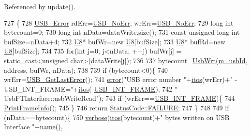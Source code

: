 Referenced by update().


\begin{DoxyCode}
727                                                                     \{
728   \hyperlink{LALUsbML_8h_aa7e5a2302774d5aa1d48a2a1cfc46e86}{USB\_Error} rdErr=\hyperlink{LALUsbML_8h_ab44759ae95dd86cbc2855adf525c43cd}{USB\_NoErr}, wrErr=\hyperlink{LALUsbML_8h_ab44759ae95dd86cbc2855adf525c43cd}{USB\_NoErr};
729   \textcolor{keywordtype}{long} \textcolor{keywordtype}{int} bytecount=0;
730   \textcolor{keywordtype}{long} \textcolor{keywordtype}{int} nData=dataWrite.size();
731   \textcolor{keyword}{const} \textcolor{keywordtype}{unsigned} \textcolor{keywordtype}{long} \textcolor{keywordtype}{int} bufSize=nData+4;
732   \hyperlink{ICECALv3_8h_a3cb25ca6f51f003950f9625ff05536fc}{U8}* bufWr=\textcolor{keyword}{new} \hyperlink{ICECALv3_8h_a3cb25ca6f51f003950f9625ff05536fc}{U8}[bufSize];
733   \hyperlink{ICECALv3_8h_a3cb25ca6f51f003950f9625ff05536fc}{U8}* bufRd=\textcolor{keyword}{new} \hyperlink{ICECALv3_8h_a3cb25ca6f51f003950f9625ff05536fc}{U8}[bufSize];
734 
735   \textcolor{keywordflow}{for}(\textcolor{keywordtype}{int} j=0; j<nData; ++j) bufWr[j] = static\_cast<unsigned char>(dataWrite[j]);
736 
737   bytecount=\hyperlink{LALUsbML_8h_a417eaf04d96bd2d3fca0111f8003bcb0}{UsbWrt}(\hyperlink{classUsbFTInterface_a91df5c0547e8be460bc087e27afe05aa}{m\_usbId}, address, bufWr, nData);
738 
739   \textcolor{keywordflow}{if} (bytecount<0)\{
740     wrErr=\hyperlink{LALUsbML_8h_a1662b77c9968848acf173f6f9c765ddd}{USB\_GetLastError}();
741     \hyperlink{classObject_a204a95f57818c0f811933917a30eff45}{error}(\textcolor{stringliteral}{"USB error number "}+\hyperlink{Tools_8h_af330027dbdafb9a30768b3613c553e60}{itos}(wrErr)+\textcolor{stringliteral}{" - USB\_INT\_FRAME="}+\hyperlink{Tools_8h_af330027dbdafb9a30768b3613c553e60}{itos}(
      \hyperlink{LALUsbML_8h_a68260f9cf3649507d12904cfa1592c11afd1c409187b1dfd3d66887a5e07e7ed3}{USB\_INT\_FRAME}),
742             \textcolor{stringliteral}{" UsbFTInterface::usbWriteRead"});
743     \textcolor{keywordflow}{if} (wrErr==\hyperlink{LALUsbML_8h_a68260f9cf3649507d12904cfa1592c11afd1c409187b1dfd3d66887a5e07e7ed3}{USB\_INT\_FRAME})\{
744       \hyperlink{LALUsbML_8h_ab3398c17204ba7fb4b47eb9bbf4ba94e}{PrintFrameInfo}();
745     \} 
746     \textcolor{keywordflow}{return} \hyperlink{classStatusCode_a6f565cbeadc76d14c72f047e5e85eb4ba3da73d4c469762eb9d3c960368252b26}{StatusCode::FAILURE};
747   \}
748 
749   \textcolor{keywordflow}{if} (nData==bytecount)\{
750     \hyperlink{classObject_a83d2db2df682907ea1115ad721c1c4a1}{verbose}(\hyperlink{Tools_8h_af330027dbdafb9a30768b3613c553e60}{itos}(bytecount)+\textcolor{stringliteral}{" bytes written on USB Interface "}+\hyperlink{classObject_a300f4c05dd468c7bb8b3c968868443c1}{name}(),

\end{DoxyCode}
